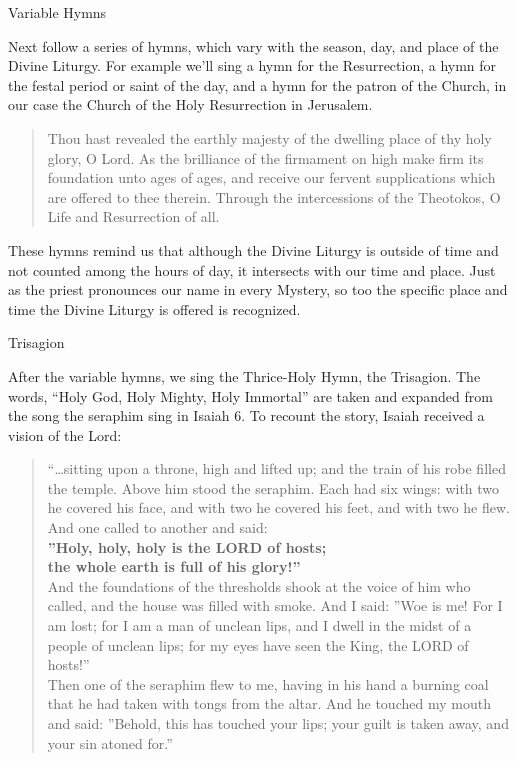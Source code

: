 \documentclass[
]{article}
\newcommand{\RL}[1]{\beginR #1\endR}
\begin{document}
Variable Hymns

Next follow a series of hymns, which vary with the season, day, and
place of the Divine Liturgy. For example we'll sing a hymn for the
Resurrection, a hymn for the festal period or saint of the day, and a
hymn for the patron of the Church, in our case the Church of the Holy
Resurrection in Jerusalem.

\begin{quote}
Thou hast revealed the earthly majesty of the dwelling place of thy holy
glory, O Lord. As the brilliance of the firmament on high make firm its
foundation unto ages of ages, and receive our fervent supplications
which are offered to thee therein. Through the intercessions of the
Theotokos, O Life and Resurrection of all.
\end{quote}

These hymns remind us that although the Divine Liturgy is outside of
time and not counted among the hours of day, it intersects with our time
and place. Just as the priest pronounces our name in every Mystery, so
too the specific place and time the Divine Liturgy is offered is
recognized.

Trisagion

After the variable hymns, we sing the Thrice-Holy Hymn, the Trisagion.
The words, ``Holy God, Holy Mighty, Holy Immortal'' are taken and
expanded from the song the seraphim sing in Isaiah 6. To recount the
story, Isaiah received a vision of the Lord:

\begin{quote}
``\ldots sitting upon a throne, high and lifted up; and the train of his
robe filled the temple. Above him stood the seraphim. Each had six
wings: with two he covered his face, and with two he covered his feet,
and with two he flew. And one called to another and said:\\
\textbf{\RL{''}Holy, holy, holy is the LORD of hosts;\\
the whole earth is full of his glory!''}\\
And the foundations of the thresholds shook at the voice of him who
called, and the house was filled with smoke. And I said: \RL{''}Woe is
me! For I am lost; for I am a man of unclean lips, and I dwell in the
midst of a people of unclean lips; for my eyes have seen the King, the
LORD of hosts!''\\
Then one of the seraphim flew to me, having in his hand a burning coal
that he had taken with tongs from the altar. And he touched my mouth and
said: \RL{''}Behold, this has touched your lips; your guilt is taken
away, and your sin atoned for.''
\end{quote}
\end{document}
